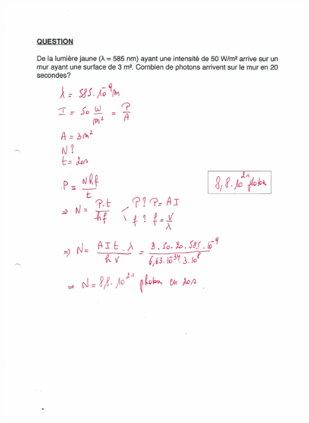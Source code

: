 {\includegraphics[width=17.498cm,height=24.13cm]{Pictures/10000001000002570000033B9D23F92FA4FE8FB5.png}

}
